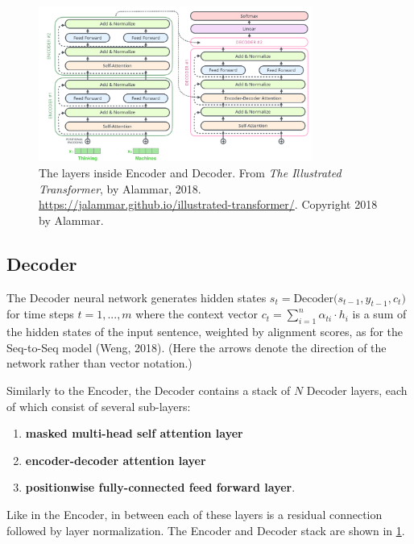 \begin{figure}[h]
\vspace{-10pt}
\centering
\includegraphics[width=0.8\textwidth]{imgs/encoderDecoderLayersDetailed.png}
\vspace{-10pt}
\caption{\footnotesize The layers inside Encoder and Decoder. From \emph{The Illustrated Transformer}, by Alammar, 2018. \url{https://jalammar.github.io/illustrated-transformer/}. Copyright 2018 by Alammar.}
\vspace{-5pt}
\label{fig:encDecLayersDetailed}
\end{figure}




\subsection{Decoder} \label{sec:TransformerDecoder}


The Decoder neural network generates hidden states $s_t = \text{Decoder}\Big( s_{t-1}, y_{t-1}, c_t \Big)$ for time steps $t = 1,..., m$ where the context vector $c_t = \sum_{i=1}^n \alpha_{ti} \cdot h_i$ is a sum of the hidden states of the input sentence, weighted by alignment scores, as for the Seq-to-Seq model (Weng, 2018). (Here the arrows denote the direction of the network rather than vector notation.)

Similarly to the Encoder, the Decoder contains a stack of $N$ Decoder layers, each of which consist of several sub-layers:
\begin{enumerate}
    \item \textbf{masked multi-head self attention layer}
    \item \textbf{encoder-decoder attention layer} 
    \item \textbf{positionwise fully-connected feed forward layer}. 
\end{enumerate}

Like in the Encoder, in between each of these layers is a residual connection followed by layer normalization. The Encoder and Decoder stack are shown in \cref{fig:encDecLayersDetailed}. 




